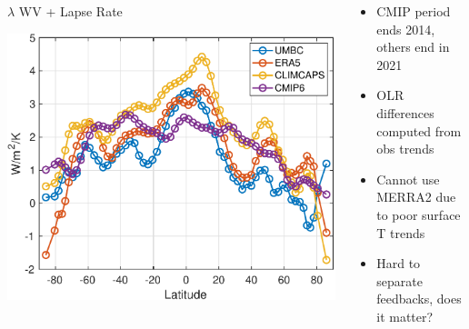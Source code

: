 \documentclass[10pt,t]{beamer}
\begin{document}
\begin{frame}
  \begin{columns}[T]
    \begin{column}{0.5\columnwidth}
      \vspace{-0.2in}
      \begin{block}{\footnotesize $\lambda$ WV + Lapse Rate}
        \vspace{-0.15in}
        \begin{center}
          \includegraphics[width=0.85\linewidth]{Figslls/wv_plus_lapse_lambda.pdf}
        \end{center}
      \end{block}
    \end{column}

    \begin{column}{0.5\columnwidth}
      \begin{footnotesize}
        \begin{itemize}
        \item CMIP period ends 2014, others end in 2021
        \item OLR differences computed from obs trends
        \item Cannot use MERRA2 due to poor surface T trends
        \item Hard to separate feedbacks, does it matter?
        \end{itemize}
      \end{footnotesize}
    \end{column}
  \end{columns}
\end{frame}
\end{document}

